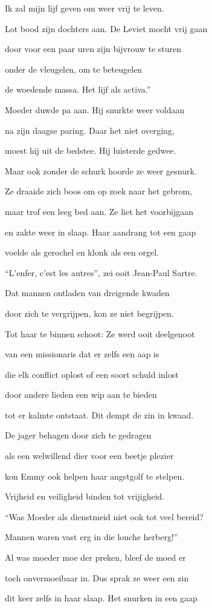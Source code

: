 Ik zal mijn lijf geven
om weer vrij te leven.

Lot bood zijn dochters aan.
De Leviet mocht vrij gaan

door voor een paar uren
zijn bijvrouw te sturen

onder de vleugelen,
om te beteugelen

de woedende massa.
Het lijf als activa.”

Moeder duwde pa aan.
Hij snurkte weer voldaan

na zijn daagse paring.
Daar het niet overging,

moest hij uit de bedstee.
Hij luisterde gedwee.

Maar ook zonder de schurk
hoorde ze weer gesnurk.

Ze draaide zich boos om
op zoek naar het gebrom,

maar trof een leeg bed aan.
Ze liet het voorbijgaan

en zakte weer in slaap.
Haar aandrang tot een gaap

voelde als gerochel
en klonk als een orgel.

“L’enfer, c’est les autres”,
zei ooit Jean-Paul Sartre.

Dat mannen ontladen
van dreigende kwaden

door zich te vergrijpen,
kon ze niet begrijpen.

Tot haar te binnen schoot:
Ze werd ooit deelgenoot

van een missionaris
dat er zelfs een aap is

die elk conflict oplost
of een soort schuld inlost

door andere lieden
een wip aan te bieden

tot er kalmte ontstaat.
Dit dempt de zin in kwaad.

De jager behagen
door zich te gedragen

als een welwillend dier
voor een beetje plezier

kon Emmy ook helpen
haar angstgolf te stelpen.

Vrijheid en veiligheid
binden tot vrijigheid.

“Was Moeder als dienstmeid
niet ook tot veel bereid?

Mannen waren vast erg
in die louche herberg!”

Al was moeder moe der
preken, bleef de moed er

toch onvermoeibaar in.
Dus sprak ze weer een zin

dit keer zelfs in haar slaap.
Het snurken in een gaap


